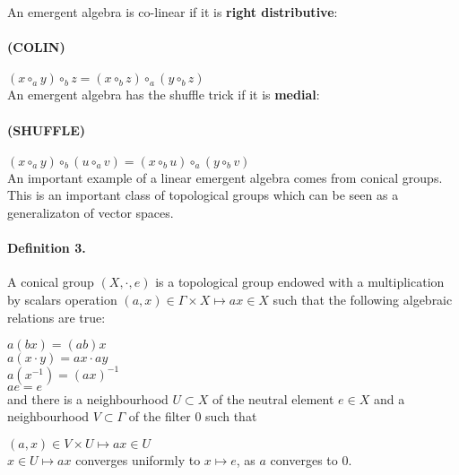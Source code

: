 \documentclass{article}
\begin{document}
\noindent An emergent algebra is co-linear if it is {\bf right distributive}:\\ 

\paragraph{(COLIN)} $\displaystyle (x \circ_{a} y) \circ_{b} z = (x \circ_{b} z) \circ_{a} (y \circ_{b} z)$ \\

\noindent An emergent algebra has the shuffle trick if it is {\bf medial}: \\

\paragraph{(SHUFFLE)} $\displaystyle (x \circ_{a} y) \circ_{b} (u \circ_{a} v) = (x \circ_{b} u) \circ_{a} (y \circ_{b} v)$ \\


An important example of a linear emergent algebra comes from conical groups. This is an important class of topological groups which can be seen as a generalizaton of vector spaces. 

\paragraph{Definition 3.} A conical group $\displaystyle (X,\cdot,e)$  is a topological group endowed with a multiplication by scalars operation $\displaystyle (a,x) \in \Gamma \times X \mapsto ax \in X$ such that the following algebraic relations are true: 

$\displaystyle  a (b x) = (ab) x$ \\

$\displaystyle  a (x \cdot y) = ax \cdot ay$ \\ 

$\displaystyle  a (x^{-1}) = ( ax)^{-1}$ \\

$ a e = e $\\
and there is a neighbourhood $U \subset X$ of the neutral element $e \in X$ and a neighbourhood $V \subset \Gamma$ of the filter $0$ such that 

$\displaystyle (a,x) \in V \times U \mapsto ax \in U$\\

$\displaystyle x  \in U \mapsto ax$ converges uniformly to $x \mapsto e$, as $a$ converges to $0$. \\
\end{document}
